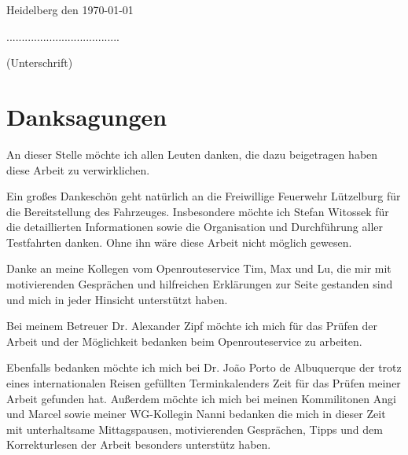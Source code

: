 {\flushleft Heidelberg den \today } {\hfill .....................................\par}
{\hfill (Unterschrift)}

\newpage
\section*{Danksagungen}

An dieser Stelle möchte ich allen Leuten danken, die dazu beigetragen haben diese Arbeit zu verwirklichen.\par
\vspace{0.5cm}
Ein großes Dankeschön geht natürlich an die Freiwillige Feuerwehr Lützelburg für die Bereitstellung des Fahrzeuges.
Insbesondere möchte ich Stefan Witossek für die detaillierten Informationen sowie die Organisation und Durchführung aller Testfahrten danken.
Ohne ihn wäre diese Arbeit nicht möglich gewesen.\par
\vspace{0.5cm}
Danke an meine Kollegen vom Openrouteservice Tim, Max und Lu, die mir mit motivierenden Gesprächen und hilfreichen Erklärungen zur Seite gestanden sind und mich in jeder Hinsicht unterstützt haben.\par
\vspace{0.5cm}
Bei meinem Betreuer Dr. Alexander Zipf möchte ich mich für das Prüfen der Arbeit und der Möglichkeit bedanken beim Openrouteservice zu arbeiten.\par
Ebenfalls bedanken möchte ich mich bei Dr. Jo\~ao Porto de Albuquerque der trotz eines internationalen Reisen gefüllten Terminkalenders Zeit für das Prüfen meiner Arbeit gefunden hat.
\vspace{0.5cm}
Außerdem möchte ich mich bei meinen Kommilitonen Angi und Marcel sowie meiner WG-Kollegin Nanni bedanken die mich in dieser Zeit mit unterhaltsame Mittagspausen, motivierenden Gesprächen, Tipps und dem Korrekturlesen der Arbeit besonders unterstütz haben.

\newpage
\vspace{1cm}
